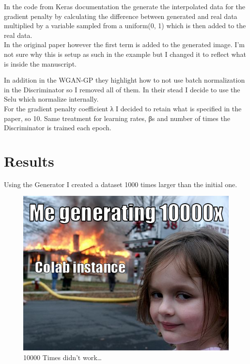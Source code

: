 \documentclass[
  letterpaper,
  DIV=11,
  numbers=noendperiod]{scrreprt}
\begin{document}
In the code from Keras documentation the generate the interpolated data
for the gradient penalty by calculating the difference between generated
and real data multiplied by a variable sampled from a uniform(0, 1)
which is then added to the real data.\\
In the original paper however the first term is added to the generated
image. I'm not sure why this is setup as such in the example but I
changed it to reflect what is inside the manuscript.

In addition in the WGAN-GP they highlight how to not use batch
normalization in the Discriminator so I removed all of them. In their
stead I decide to use the Selu which normalize internally.\\

For the gradient penalty coefficient λ I decided to retain what is
specified in the paper, so 10. Same treatment for learning rates, βs and
number of times the Discriminator is trained each epoch.

\hypertarget{results}{%
\chapter{Results}\label{results}}

Using the Generator I created a dataset 1000 times larger than the
initial one.

\begin{figure}

{\centering \includegraphics{10000x.png}

}

\caption{10000 Times didn't work\ldots{}}

\end{figure}
\end{document}
